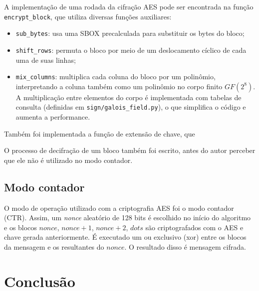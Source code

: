 \documentclass[a4paper, 10.5pt]{article}
\begin{document}
A implementação de uma rodada da cifração AES pode ser encontrada na função
\verb|encrypt_block|, que utiliza diversas funções auxiliares:
\begin{itemize}
  \item \verb|sub_bytes|: usa uma SBOX precalculada para substituir os bytes do
      bloco;
  \item \verb|shift_rows|: permuta o bloco por meio de um deslocamento cíclico
      de cada uma de suas linhas;
  \item \verb|mix_columns|: multiplica cada coluna do bloco por um polinômio,
      interpretando a coluna também como um polinômio no corpo finito $GF(2^8)$.
      A multiplicação entre elementos do corpo é implementada com tabelas de
      consulta (definidas em \verb|sign/galois_field.py|), o que simplifica o código e aumenta a performance.
\end{itemize} 

Também foi implementada a função de extensão de chave, que 

O processo de decifração de um bloco também foi escrito, antes do autor perceber que ele não é utilizado no modo contador.

\subsection{Modo contador} %
\label{sec:ctr}
    O modo de operação utilizado com a criptografia AES foi o modo contador (CTR).
    Assim, um \textit{nonce} aleatório de 128 bits é escolhido no início do
    algoritmo e os blocos $nonce$, $nonce+1$, $nonce+2$, $dots$ são
    criptografados com o AES e chave gerada anteriormente. É executado um ou
    exclusivo (xor) entre os blocos da mensagem e os resultantes do $nonce$. O
    resultado disso é mensagem cifrada.

    

\section{Conclusão} %
\label{sec:conclusao}
    

% 


\end{document}
